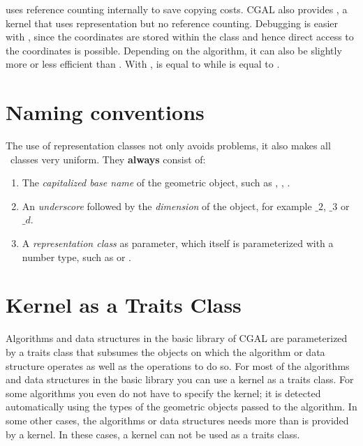  uses reference counting internally to save
copying costs. CGAL also provides , a
kernel that uses  representation but no reference
counting.  Debugging is easier with ,
since the coordinates are stored within the class and hence direct access to
the coordinates is possible.  Depending on the algorithm, it can also be
slightly more or less efficient than .
With ,
 is equal to
 while
 is equal to .

\section{Naming conventions}

The use of representation classes not only avoids problems, it
also makes all \cgal\ classes very uniform. They {\bf always} consist of:
\begin{enumerate}
\begin{ccTexOnly}
\itemsep0pt\parskip0pt
\end{ccTexOnly}


\item The {\em capitalized base name} of the geometric object, such as 
      , , .

\item An {\em underscore} followed by the {\em dimension} of the object, 
      for example $\_2$, $\_3$ or $\_d$.

\item A {\em representation class} as parameter, which itself is
      parameterized with a number type, such as  
      or .
\end{enumerate}

\section{Kernel as a Traits Class}
Algorithms and data structures in the basic library of CGAL are parameterized 
by a traits class that subsumes the objects on which the algorithm or data
structure operates as well as the operations to do so. For most of the 
algorithms and data structures in the basic library you can use a kernel
as a traits class. For some algorithms you even do not have to specify
the kernel; it is detected automatically using the types of the geometric
objects passed to the algorithm. In some other cases, the algorithms 
or data structures needs more than is provided by a kernel. In these
cases, a kernel can not be used as a traits class.

